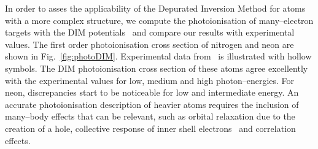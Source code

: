 \documentclass[10pt]{article}
\begin{document}
In order to asses the applicability of the Depurated Inversion Method
for atoms with a more complex structure, we compute the 
photoionisation of many--electron targets with the DIM 
potentials~\cite{Mendez2016} and compare our results with 
experimental values. 
The first order photoionisation cross section of nitrogen and neon 
are shown in Fig.~\ref{fig:photoDIM}. Experimental data 
from~\cite{Henke1993,Samson1990,Samson2002,Stolte2016} is illustrated 
with hollow symbols. The DIM photoionisation cross section
of these atoms agree excellently with the experimental values for 
low, medium and high photon--energies. For neon, discrepancies start 
to be noticeable for low and intermediate energy. An accurate 
photoionisation description of heavier atoms requires the inclusion 
of many--body effects that can be relevant, such as orbital 
relaxation due to the creation of a hole, collective response 
of inner shell electrons~\cite{Ederer1964} and correlation effects.
\end{document}

